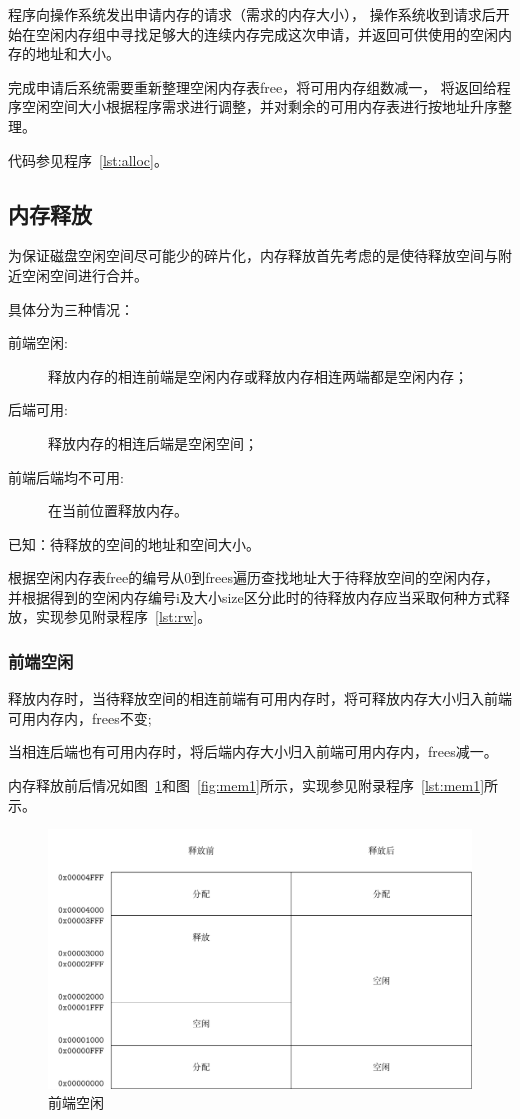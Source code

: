 程序向操作系统发出申请内存的请求（需求的内存大小），
操作系统收到请求后开始在空闲内存组中寻找足够大的连续内存完成这次申请，并返回可供使用的空闲内存的地址和大小。

完成申请后系统需要重新整理空闲内存表free，将可用内存组数减一，
将返回给程序空闲空间大小根据程序需求进行调整，并对剩余的可用内存表进行按地址升序整理。

代码参见程序~\ref{lst:alloc}。


\subsection{内存释放}

为保证磁盘空闲空间尽可能少的碎片化，内存释放首先考虑的是使待释放空间与附近空闲空间进行合并\cite{bryant2003computer}。

具体分为三种情况：

\begin{description}
\item[前端空闲:]释放内存的相连前端是空闲内存或释放内存相连两端都是空闲内存；
\item[后端可用:]释放内存的相连后端是空闲空间；
\item[前端后端均不可用:]在当前位置释放内存。
\end{description}

\newpage

已知：待释放的空间的地址和空间大小。

根据空闲内存表free的编号从0到frees遍历查找地址大于待释放空间的空闲内存，
并根据得到的空闲内存编号i及大小size区分此时的待释放内存应当采取何种方式释放，实现参见附录程序~\ref{lst:rw}。

\subsubsection{前端空闲}

释放内存时，当待释放空间的相连前端有可用内存时，将可释放内存大小归入前端可用内存内，frees不变;

当相连后端也有可用内存时，将后端内存大小归入前端可用内存内，frees减一。

内存释放前后情况如图~\ref{fig:mem0}和图~\ref{fig:mem1}所示，实现参见附录程序~\ref{lst:mem1}所示。

\begin{figure}[H]
  \centering
  \includegraphics[width=.7\textwidth]{../Fig/mem0.pdf}
  \caption{前端空闲}
  \label{fig:mem0}
\end{figure}

